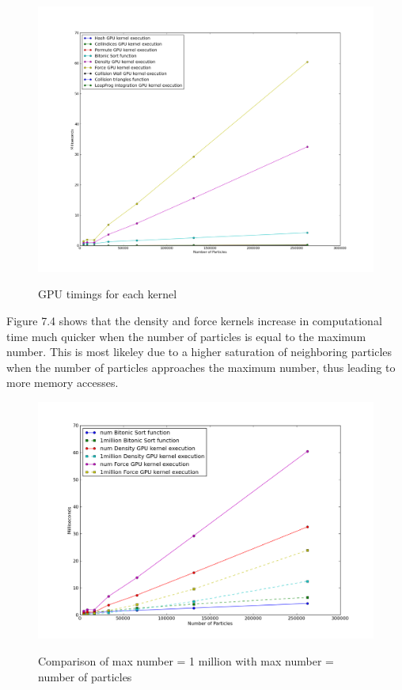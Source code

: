 \begin{figure}[!htc]
 		\centering
		\includegraphics[scale=0.4]{figures/nv_kernel_num.png}
		\label{fig:logic}
        \caption{ GPU timings for each kernel }
\end{figure}


\pagebreak

Figure 7.4 shows that the density and force kernels increase in computational
time much quicker when the number of particles is equal to the maximum number.
This is most likeley due to a higher saturation of neighboring particles when
the number of particles approaches the maximum number, thus leading to more memory accesses.

\begin{figure}[!htc]
 		\centering
		\includegraphics[scale=0.5]{figures/nv_kernel_neighbor.png}
		\label{fig:logic}
        \caption{ Comparison of max number = 1 million with max number = number of particles }
\end{figure}

